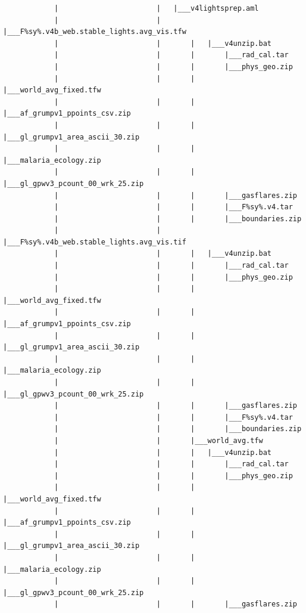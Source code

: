\documentclass[]{book}
\begin{document}
\begin{verbatim}
            |                       |   |___v4lightsprep.aml
            |                       |       |___F%sy%.v4b_web.stable_lights.avg_vis.tfw
            |                       |       |   |___v4unzip.bat
            |                       |       |       |___rad_cal.tar
            |                       |       |       |___phys_geo.zip
            |                       |       |       |___world_avg_fixed.tfw
            |                       |       |       |___af_grumpv1_ppoints_csv.zip
            |                       |       |       |___gl_grumpv1_area_ascii_30.zip
            |                       |       |       |___malaria_ecology.zip
            |                       |       |       |___gl_gpwv3_pcount_00_wrk_25.zip
            |                       |       |       |___gasflares.zip
            |                       |       |       |___F%sy%.v4.tar
            |                       |       |       |___boundaries.zip
            |                       |       |___F%sy%.v4b_web.stable_lights.avg_vis.tif
            |                       |       |   |___v4unzip.bat
            |                       |       |       |___rad_cal.tar
            |                       |       |       |___phys_geo.zip
            |                       |       |       |___world_avg_fixed.tfw
            |                       |       |       |___af_grumpv1_ppoints_csv.zip
            |                       |       |       |___gl_grumpv1_area_ascii_30.zip
            |                       |       |       |___malaria_ecology.zip
            |                       |       |       |___gl_gpwv3_pcount_00_wrk_25.zip
            |                       |       |       |___gasflares.zip
            |                       |       |       |___F%sy%.v4.tar
            |                       |       |       |___boundaries.zip
            |                       |       |___world_avg.tfw
            |                       |       |   |___v4unzip.bat
            |                       |       |       |___rad_cal.tar
            |                       |       |       |___phys_geo.zip
            |                       |       |       |___world_avg_fixed.tfw
            |                       |       |       |___af_grumpv1_ppoints_csv.zip
            |                       |       |       |___gl_grumpv1_area_ascii_30.zip
            |                       |       |       |___malaria_ecology.zip
            |                       |       |       |___gl_gpwv3_pcount_00_wrk_25.zip
            |                       |       |       |___gasflares.zip

\end{verbatim}
\end{document}

